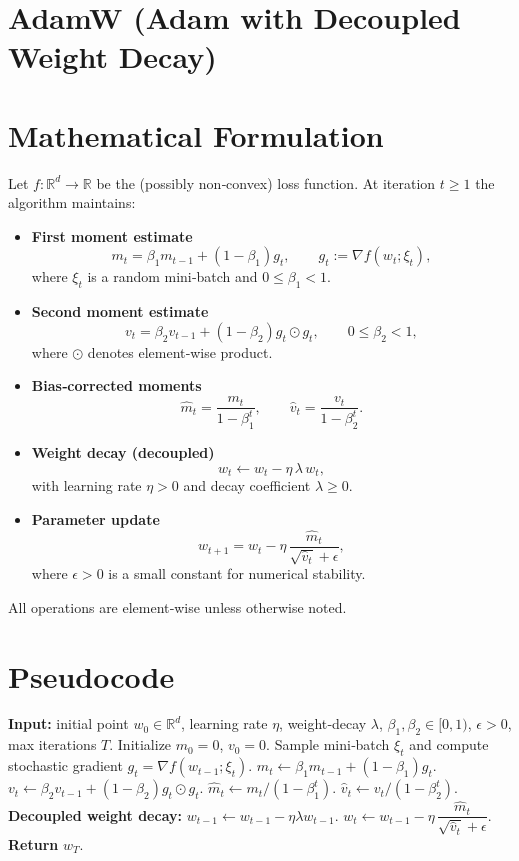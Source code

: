\documentclass{article}
\newcommand{\R}{\mathbb{R}}
\begin{document}
\section*{AdamW (Adam with Decoupled Weight Decay)}

\section*{Mathematical Formulation}
Let $f:\R^{d}\rightarrow\R$ be the (possibly non‑convex) loss function.  
At iteration $t\ge 1$ the algorithm maintains:
\begin{itemize}[nosep]
\item \textbf{First moment estimate} 
\[
m_t = \beta_1 m_{t-1} + (1-\beta_1) g_t,
\qquad g_t := \nabla f(w_t; \xi_t),
\]
where $\xi_t$ is a random mini‑batch and $0\le\beta_1<1$.
\item \textbf{Second moment estimate} 
\[
v_t = \beta_2 v_{t-1} + (1-\beta_2) g_t\odot g_t,
\qquad 0\le\beta_2<1,
\]
where $\odot$ denotes element‑wise product.
\item \textbf{Bias‑corrected moments}
\[
\hat m_t = \frac{m_t}{1-\beta_1^{t}},\qquad
\hat v_t = \frac{v_t}{1-\beta_2^{t}} .
\]
\item \textbf{Weight decay (decoupled)} 
\[
w_t \leftarrow w_t - \eta\,\lambda\, w_t,
\]
with learning rate $\eta>0$ and decay coefficient $\lambda\ge0$.
\item \textbf{Parameter update}
\[
w_{t+1}= w_t - \eta\,
\frac{\hat m_t}{\sqrt{\hat v_t}+\epsilon},
\]
where $\epsilon>0$ is a small constant for numerical stability.
\end{itemize}
All operations are element‑wise unless otherwise noted.

\section*{Pseudocode}
\begin{algorithm}[H]
\caption{AdamW}
\begin{algorithmic}[1]
\State \textbf{Input:} initial point $w_0\in\R^d$, learning rate $\eta$, 
weight‑decay $\lambda$, $\beta_1,\beta_2\in[0,1)$, $\epsilon>0$, 
max iterations $T$.
\State Initialize $m_0=0$, $v_0=0$.
    \State Sample mini‑batch $\xi_t$ and compute stochastic gradient $g_t=\nabla f(w_{t-1};\xi_t)$.
    \State $m_t \gets \beta_1 m_{t-1} + (1-\beta_1) g_t$.
    \State $v_t \gets \beta_2 v_{t-1} + (1-\beta_2) g_t\odot g_t$.
    \State $\hat m_t \gets m_t/(1-\beta_1^{t})$.
    \State $\hat v_t \gets v_t/(1-\beta_2^{t})$.
    \State \textbf{Decoupled weight decay:} $w_{t-1}\gets w_{t-1} - \eta\lambda w_{t-1}$.
    \State $w_t \gets w_{t-1} - \eta\,\dfrac{\hat m_t}{\sqrt{\hat v_t}+\epsilon}$.
\EndFor
\State \textbf{Return} $w_T$.
\end{algorithmic}
\end{algorithm}
\end{document}

